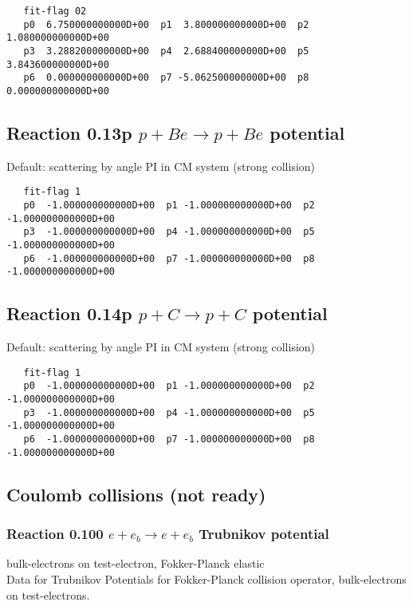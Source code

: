 \documentclass[12pt,dvipdfmx]{article}
\begin{document}
\begin{small}\begin{verbatim}
   fit-flag 02
   p0  6.750000000000D+00  p1  3.800000000000D+00  p2  1.080000000000D+00
   p3  3.288200000000D+00  p4  2.688400000000D+00  p5  3.843600000000D+00
   p6  0.000000000000D+00  p7 -5.062500000000D+00  p8  0.000000000000D+00
\end{verbatim}\end{small}


\newpage

\subsection{Reaction 0.13p $ p + Be \rightarrow p + Be $ potential }

Default: scattering by angle PI in CM system (strong collision)

\begin{small}\begin{verbatim}
   fit-flag 1
   p0  -1.000000000000D+00  p1 -1.000000000000D+00  p2 -1.000000000000D+00
   p3  -1.000000000000D+00  p4 -1.000000000000D+00  p5 -1.000000000000D+00
   p6  -1.000000000000D+00  p7 -1.000000000000D+00  p8 -1.000000000000D+00
\end{verbatim}\end{small}


\subsection{Reaction 0.14p $ p + C \rightarrow p + C $ potential }

Default: scattering by angle PI in CM system (strong collision)

\begin{small}\begin{verbatim}
   fit-flag 1
   p0  -1.000000000000D+00  p1 -1.000000000000D+00  p2 -1.000000000000D+00
   p3  -1.000000000000D+00  p4 -1.000000000000D+00  p5 -1.000000000000D+00
   p6  -1.000000000000D+00  p7 -1.000000000000D+00  p8 -1.000000000000D+00
\end{verbatim}\end{small}

\newpage

\subsection{Coulomb collisions (not ready)}

\subsubsection{
Reaction 0.100 $ e + e_b \rightarrow e + e_b$ Trubnikov potential}
bulk-electrons on test-electron, Fokker-Planck elastic \\
Data for Trubnikov Potentials for Fokker-Planck collision
operator, bulk-electrons on test-electrons.
\end{document}
